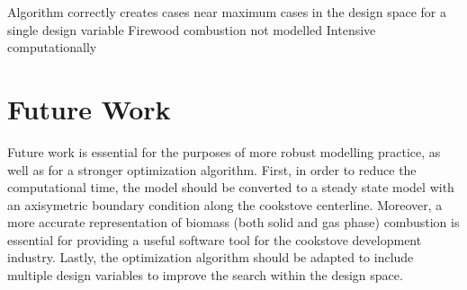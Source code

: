 \documentclass[3p,times,twocolumn]{elsarticle}
\begin{document}
Algorithm correctly creates cases near maximum cases in the design space for a single design variable
Firewood combustion not modelled
Intensive computationally


\section{Future Work}
Future work is essential for the purposes of more robust modelling practice, as well as for a stronger optimization algorithm. First, in order to reduce the computational time, the model should be converted to a steady state model with an axisymetric boundary condition along the cookstove centerline. Moreover, a more accurate representation of biomass (both solid and gas phase) combustion is essential for providing a useful software tool for the cookstove development industry. Lastly, the optimization algorithm should be adapted to include multiple design variables to improve the search within the design space.

















\end{document}

